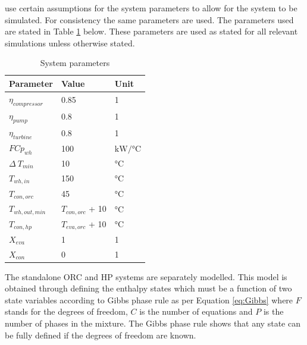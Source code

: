 \documentclass[a4paper,12pt]{article}
\newcommand{\nomunit}[1]{%
\renewcommand{\nomentryend}{\hspace*{\fill}#1}}
\begin{document}
\textcite{YU2018330} use certain assumptions for the system parameters to allow for the system to be simulated. For consistency the same parameters are used. The parameters used are stated in Table \ref{tab:params} below. These parameters are used as stated for all relevant simulations unless otherwise stated.
\begin{table}[H]
  \centering
  \caption{System parameters}
  \label{tab:params}
  \begin{tabular}{lll}
    \toprule
    Parameter & Value & Unit \\
    \midrule
    $\eta_{compressor}$\nomenclature{$\eta_{compressor}$}{Isentropic efficiency of the compressor \nomunit{1}} & 0.85 & 1\\
    $\eta_{pump}$\nomenclature{$\eta_{compressor}$}{Isentropic efficiency of the pump \nomunit{1}} & 0.8 & 1\\
    $\eta_{turbine}$\nomenclature{$\eta_{compressor}$}{Isentropic efficiency of the turbine \nomunit{1}} & 0.8 & 1\\
    $FCp_{wh}$\nomenclature{$FCp_{wh}$}{Heat capacity flow rate of the waste heat \nomunit{\si{\kilo\watt\per\celsius}}} & 100 & $\si{\kilo\watt\per\celsius}$\\
    $\Delta~T_{min}$ & 10 & $\si{\celsius}$\\
    $T_{wh,in}$\nomenclature{$T_{wh,in}$}{Temperature of waste heat into the heat exchange system \nomunit{\si{\celsius}}} & 150 & $\si{\celsius}$\\
    $T_{con,orc}$\nomenclature{$T_{con,orc}$}{Temperature at the ORC condenser outlet \nomunit{\si{\celsius}}} & 45 & $\si{\celsius}$\\
    $T_{wh,out,min}$\nomenclature{$T_{wh,out,min}$}{Minimum temperature of the waste heat outlet \nomunit{\si{\celsius}}} & $T_{con,orc}$ + 10 & $\si{\celsius}$\\
    $T_{con,hp}$\nomenclature{$T_{con,hp}$}{Temperature at the heat pumo condenser outlet \nomunit{\si{\celsius}}} & $T_{eva,orc}$ + 10 & $\si{\celsius}$\\
    $X_{eva}$\nomenclature{$X_{eva}$}{Vapour quality at the evaporator outlet \nomunit{1}} & 1 & 1\\
    $X_{con}$\nomenclature{$X_{con}$}{Vapour quality at the condenser outlet \nomunit{1}} & 0 & 1\\
    \bottomrule
  \end{tabular}
\end{table}
The standalone ORC and HP systems are separately modelled. This model is obtained through defining the enthalpy states which must be a function of two state variables according to Gibbs phase rule as per Equation \ref{eq:Gibbs} where $F$ stands for the degrees of freedom, $C$ is the number of equations and $P$ is the number of phases in the mixture. The Gibbs phase rule shows that any state can be fully defined if the degrees of freedom are known.
\end{document}
